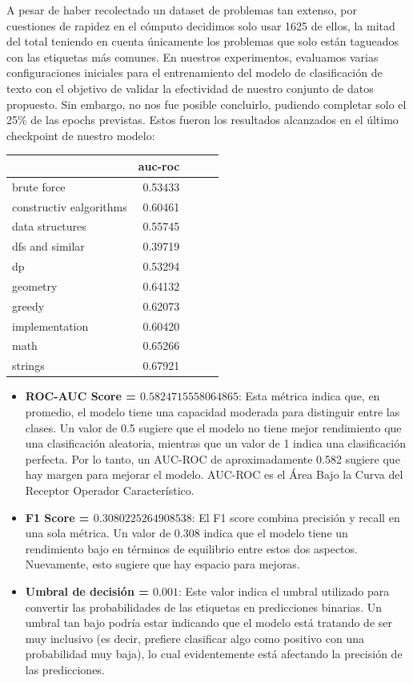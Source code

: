 \documentclass{article}
\begin{document}
A pesar de haber recolectado un dataset de problemas tan extenso, por cuestiones de 
rapidez en el cómputo decidimos solo usar 1625 de ellos, la mitad 
del total teniendo en cuenta únicamente los problemas que solo están 
tagueados con las etiquetas más comunes. En nuestros experimentos, evaluamos varias configuraciones 
iniciales para el entrenamiento del modelo de clasificación de texto con el objetivo de 
validar la efectividad de nuestro conjunto de datos propuesto. Sin embargo, no nos fue posible 
concluirlo, pudiendo completar solo el 25\% de las epochs previstas. Estos fueron los resultados 
alcanzados en el último checkpoint de nuestro modelo:

\begin{tabular}{lrrrr}
    \toprule
    {}                      & auc-roc \\
    \midrule
    brute force             & 0.53433 \\
    constructiv ealgorithms & 0.60461 \\
    data structures         & 0.55745 \\
    dfs and similar         & 0.39719 \\
    dp                      & 0.53294 \\
    geometry                & 0.64132 \\
    greedy                  & 0.62073 \\
    implementation          & 0.60420 \\
    math                    & 0.65266 \\
    strings                 & 0.67921 \\
    \bottomrule
\end{tabular}

\begin{itemize}
    \item \textbf{ROC-AUC Score = $0.5824715558064865$}: Esta métrica indica que, en promedio, el modelo tiene una
          capacidad moderada para distinguir entre las clases. Un valor de 0.5 sugiere que el modelo 
          no tiene mejor rendimiento que una clasificación aleatoria, mientras que un valor de 1 
          indica una clasificación perfecta. Por lo tanto, un AUC-ROC de aproximadamente 0.582 sugiere 
          que hay margen para mejorar el modelo. AUC-ROC  es el Área Bajo la Curva del Receptor Operador 
          Característico.
    \item \textbf{F1 Score = $0.3080225264908538$}: El F1 score combina precisión y recall en una
          sola métrica. Un valor de 0.308 indica que el modelo tiene un rendimiento bajo en términos de 
          equilibrio entre estos dos aspectos. Nuevamente, esto sugiere que hay espacio para mejoras.
    \item \textbf{Umbral de decisión = $0.001$}: Este valor indica el umbral utilizado para convertir las
          probabilidades de las etiquetas en predicciones binarias. Un umbral tan bajo podría estar 
          indicando que el modelo está tratando de ser muy inclusivo (es decir, prefiere clasificar 
          algo como positivo con una probabilidad muy baja), lo cual evidentemente está afectando la 
          precisión de las predicciones.
\end{itemize}
\end{document}
